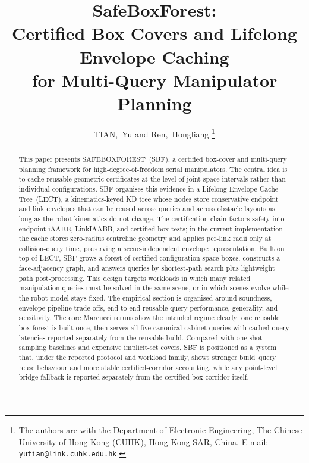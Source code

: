 \documentclass[journal]{IEEEtran}
\DeclareRobustCommand{\textsc}[1]{\textnormal{\MakeUppercase{#1}}}
\newcommand{\iAABB}{\ensuremath{\mathrm{iAABB}}}
\begin{document}
\title{SafeBoxForest:\\ Certified Box Covers and Lifelong Envelope Caching\\
for Multi-Query Manipulator Planning}

\author{TIAN,~Yu and Ren,~Hongliang%
\thanks{The authors are with the Department of Electronic Engineering,
The Chinese University of Hong Kong (CUHK), Hong Kong SAR, China.
E-mail: \texttt{yutian@link.cuhk.edu.hk}.}}

\maketitle

\begin{abstract}
This paper presents \textsc{SafeBoxForest}~(SBF), a certified box-cover and
multi-query planning framework for high-degree-of-freedom serial manipulators.
The central idea is to cache reusable geometric certificates at the level of
joint-space intervals rather than individual configurations. SBF organises this
evidence in a Lifelong Envelope Cache Tree~(LECT), a kinematics-keyed KD tree
whose nodes store conservative endpoint and link envelopes that can be reused
across queries and across obstacle layouts as long as the robot kinematics do
not change. The certification chain factors safety into endpoint \iAABB,
LinkIAABB, and certified-box tests; in the current implementation the cache stores
zero-radius centreline geometry and applies per-link radii only at
collision-query time, preserving a scene-independent envelope representation.
Built on top of LECT, SBF grows a forest of certified configuration-space
boxes, constructs a face-adjacency graph, and answers queries by shortest-path
search plus lightweight path post-processing. This design targets workloads in
which many related manipulation queries must be solved in the same scene, or in
which scenes evolve while the robot model stays fixed. The
empirical section is organised around soundness, envelope-pipeline trade-offs,
end-to-end reusable-query performance, generality, and sensitivity. The core
Marcucci reruns show the intended regime clearly: one reusable box
forest is built once, then serves all five canonical cabinet queries with
cached-query latencies reported separately from the reusable build. Compared
with one-shot sampling baselines and expensive implicit-set covers, SBF is
positioned as a system that, under the reported protocol and workload family,
shows stronger build--query reuse behaviour and more stable certified-corridor
accounting, while any point-level bridge fallback is reported separately from
the certified box corridor itself.
\end{abstract}
\end{document}
